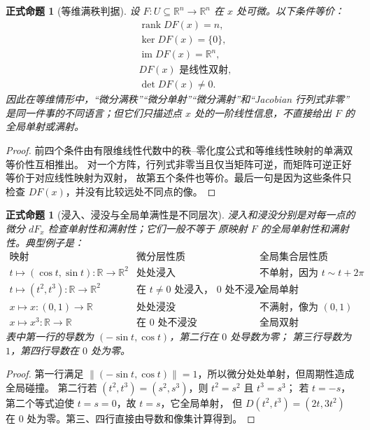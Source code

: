 \documentclass[UTF8,fontset=none,a4paper,11pt]{ctexart}
\theoremstyle{foundation-definition}
\theoremstyle{foundation-theorem}
\theoremstyle{foundation-proposition}
\newtheorem{proposition}[definition]{正式命题}
\theoremstyle{foundation-example}
\theoremstyle{foundation-remark}
\theoremstyle{foundation-theorem}
\begin{document}
\begin{proposition}[等维满秩判据]\label{prop:equal-dimension-full-rank}
设 \(F:U\subseteq\mathbb R^n\to\mathbb R^n\) 在 \(x\) 处可微。以下条件等价：
\[
\begin{aligned}
&\operatorname{rank}DF(x)=n,\\
&\ker DF(x)=\{0\},\\
&\operatorname{im}DF(x)=\mathbb R^n,\\
&DF(x)\text{ 是线性双射},\\
&\det DF(x)\neq0.
\end{aligned}
\]
因此在等维情形中，“微分满秩”“微分单射”“微分满射”和“Jacobian 行列式非零”
是同一件事的不同语言；但它们只描述点 \(x\) 处的一阶线性信息，不直接给出 \(F\) 的全局单射或满射。
\end{proposition}

\begin{proof}
前四个条件由有限维线性代数中的秩--零化度公式和等维线性映射的单满双等价性互相推出。
对一个方阵，行列式非零当且仅当矩阵可逆，而矩阵可逆正好等价于对应线性映射为双射，
故第五个条件也等价。最后一句是因为这些条件只检查 \(DF(x)\)，并没有比较远处不同点的像。
\end{proof}

\begin{proposition}[浸入、浸没与全局单满性是不同层次]\label{prop:immersion-submersion-global-separation}
浸入和浸没分别是对每一点的微分 \(dF_x\) 检查单射性和满射性；它们一般不等于
原映射 \(F\) 的全局单射性和满射性。典型例子是：
\[
\begin{array}{c|c|c}
\text{映射}&\text{微分层性质}&\text{全局集合层性质}\\
\hline
t\mapsto(\cos t,\sin t):\mathbb R\to\mathbb R^2&
\text{处处浸入}&\text{不单射，因为 }t\sim t+2\pi\\
t\mapsto(t^2,t^3):\mathbb R\to\mathbb R^2&
\text{在 }t\ne0\text{ 处浸入， }0\text{ 处不浸入}&\text{全局单射}\\
x\mapsto x:(0,1)\to\mathbb R&
\text{处处浸没}&\text{不满射，像为 }(0,1)\\
x\mapsto x^3:\mathbb R\to\mathbb R&
\text{在 }0\text{ 处不浸没}&\text{全局双射}
\end{array}
\]
表中第一行的导数为 \((-\sin t,\cos t)\)，第二行在 \(0\) 处导数为零；
第三行导数为 \(1\)，第四行导数在 \(0\) 处为零。
\end{proposition}

\begin{proof}
第一行满足 \(\|(-\sin t,\cos t)\|=1\)，所以微分处处单射，但周期性造成全局碰撞。
第二行若 \((t^2,t^3)=(s^2,s^3)\)，则 \(t^2=s^2\) 且 \(t^3=s^3\)；
若 \(t=-s\)，第二个等式迫使 \(t=s=0\)，故 \(t=s\)，它全局单射，
但 \(D(t^2,t^3)=(2t,3t^2)\) 在 \(0\) 处为零。第三、四行直接由导数和像集计算得到。
\end{proof}
\end{document}
